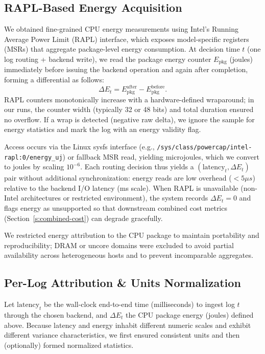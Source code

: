 \subsection{RAPL-Based Energy Acquisition}
\label{s:rapl-acquisition}
We obtained fine-grained CPU energy measurements using Intel's Running Average Power Limit (RAPL) interface, which exposes model-specific registers (MSRs) that aggregate package-level energy consumption. At decision time $t$ (one log routing + backend write), we read the package energy counter $E_{\text{pkg}}$ (joules) immediately before issuing the backend operation and again after completion, forming a differential as follows:
\[
\Delta E_t = E_{\text{pkg}}^{\text{after}} - E_{\text{pkg}}^{\text{before}}.
\]
RAPL counters monotonically increase with a hardware-defined wraparound; in our runs, the counter width (typically 32 or 48 bits) and total duration ensured no overflow. If a wrap is detected (negative raw delta), we ignore the sample for energy statistics and mark the log with an energy validity flag.

Access occurs via the Linux sysfs interface (e.g., \texttt{/sys/class/powercap/intel-rapl:0/energy\_uj}) or fallback MSR read, yielding microjoules, which we convert to joules by scaling $10^{-6}$. Each routing decision thus yields a $(\text{latency}_t, \Delta E_t)$ pair without additional synchronization: energy reads are low overhead ($<5\mu s$) relative to the backend I/O latency (ms scale). When RAPL is unavailable (non-Intel architectures or restricted environment), the system records $\Delta E_t = 0$ and flags energy as unsupported so that downstream combined cost metrics (Section~\ref{s:combined-cost}) can degrade gracefully.

We restricted energy attribution to the CPU package to maintain portability and reproducibility; DRAM or uncore domains were excluded to avoid partial availability across heterogeneous hosts and to prevent incomparable aggregates.

\subsection{Per-Log Attribution \& Units Normalization}
\label{s:per-log-energy-normalization}
Let $\text{latency}_t$ be the wall-clock end-to-end time (milliseconds) to ingest log $t$ through the chosen backend, and $\Delta E_t$ the CPU package energy (joules) defined above. Because latency and energy inhabit different numeric scales and exhibit different variance characteristics, we first ensured consistent units and then (optionally) formed normalized statistics.

